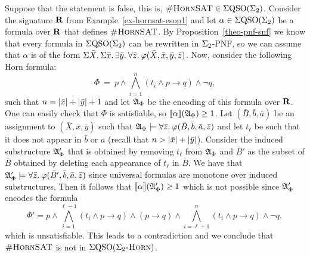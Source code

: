 Suppose that the statement is false, this is, $\textsc{\#HornSAT} \in \Sigma{\rm QSO}(\Sigma_{2})$. Consider the signature $\mathbf{R}$ from Example~\ref{ex-hornsat-esop1} and let $\alpha \in \Sigma{\rm QSO}(\Sigma_{2})$ be a formula over $\mathbf{R}$ that defines $\textsc{\#HornSAT}$. By Proposition~\ref{theo-pnf-snf} we know that every formula in $\Sigma{\rm QSO}(\Sigma_{2})$ can be rewritten in $\Sigma_{2}$-PNF, so we can assume that $\alpha$ is of the form $\Sigma{\bar{X}}.\,\Sigma{\bar{x}}.\, \exists{\bar{y}}.\: \forall{\bar{z}}.\:\varphi(\bar{X},\bar{x},\bar{y},\bar{z})$. Now, consider the following Horn formula:
$$
\Phi \ = \ p \wedge \bigwedge_{i = 1}^n (t_i \wedge p \to q) \wedge \neg q,
$$
such that $n = \vert \bar{x} \vert + \vert \bar{y} \vert + 1$ and let $\mathfrak{A}_{\Phi}$ be the encoding of this formula over $\mathbf{R}$. 
One can easily check that $\Phi$ is satisfiable, so ${\llbracket{}{\alpha}\rrbracket}(\mathfrak{A}_{\Phi}) \geq 1$. Let $(\bar{B},\bar{b},\bar{a})$ be an assignment to $(\bar{X},\bar{x},\bar{y})$ such that $\mathfrak{A}_{\Phi} \models \forall{\bar{z}}.\: \varphi(\bar{B},\bar{b},\bar{a},\bar{z})$ and let $t_{\ell}$ be such that it does not appear in $\bar{b}$ or $\bar{a}$ (recall that $n > \vert \bar{x} \vert + \vert \bar{y} \vert$). Consider the induced substructure $\mathfrak{A}_{\Phi}'$ that is obtained by removing $t_{\ell}$ from $\mathfrak{A}_{\Phi}$ and $\bar{B}'$ as the subset of $\bar{B}$ obtained by deleting each appearance of $t_{\ell}$ in $\bar{B}$. We have that $\mathfrak{A}_{\Phi}'\models \forall{\bar{z}}.\:\varphi(\bar{B}',\bar{b},\bar{a},\bar{z})$ since universal formulas are monotone over induced substructures. Then it follows that ${\llbracket{}{\alpha}\rrbracket}(\mathfrak{A}_{\Phi}') \geq 1$ which is not possible since $\mathfrak{A}_{\Phi}'$ encodes the formula
$$
\Phi' = p \wedge \bigwedge_{i = 1}^{\ell-1} (t_i \wedge p \to q) \wedge (p\to q) \wedge \bigwedge_{i = \ell+1}^{n} (t_i \wedge p \to q) \wedge \neg q,
$$
which is unsatisfiable. This leads to a contradiction and we conclude that $\textsc{\#HornSAT}$ is not in $\Sigma{\rm QSO}(\Sigma_2\textsc{-Horn})$.